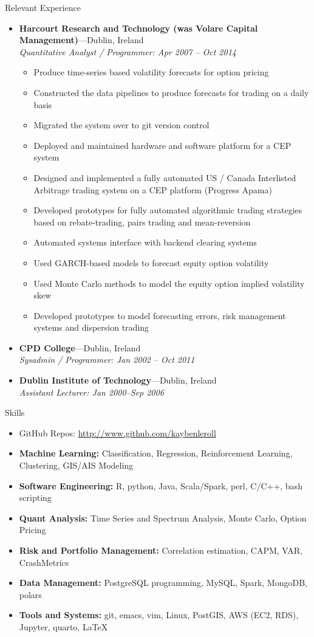 \documentclass[11pt,a4paper,oneside]{article}
\newenvironment{ressection}[1]{
  \vspace{4pt}
  {\Large#1}
  \begin{itemize}
    \vspace{3pt}
}{
  \end{itemize}
}
\newcommand{\resitem}[1]{
  \vspace{-4pt}
  \item \begin{flushleft} #1 \end{flushleft}
}
\newcommand{\ressubitem}[1]{
  \vspace{-1pt}
  \item \begin{flushleft} #1 \end{flushleft}
}
\newcommand{\resbigitem}[3]{
  \vspace{-5pt}
  \item
  \textbf{#1}---#2 \\
  \textit{#3}
}
\newenvironment{ressubsec}[3]{
  \resbigitem{#1}{#2}{#3}
  \vspace{-2pt}
  \begin{itemize}
}{
  \end{itemize}
}
\begin{document}
\begin{ressection}{Relevant Experience}
  \begin{ressubsec}{Harcourt Research and Technology (was Volare Capital Management)}{Dublin, Ireland}{Quantitative Analyst / Programmer: Apr 2007 -- Oct 2014}
    \ressubitem{Produce time-series based volatility forecasts for option pricing}
    \ressubitem{Constructed the data pipelines to produce forecasts for trading on a daily basis}
    \ressubitem{Migrated the system over to git version control}
    \ressubitem{Deployed and maintained hardware and software platform for a CEP system}
    \ressubitem{Designed and implemented a fully automated US / Canada Interlisted Arbitrage trading system on a CEP platform (Progress Apama)}
    \ressubitem{Developed prototypes for fully automated algorithmic trading strategies based on rebate-trading, pairs trading and mean-reversion}
    \ressubitem{Automated systems interface with backend clearing systems}
    \ressubitem{Used GARCH-based models to forecast equity option volatility}
    \ressubitem{Used Monte Carlo methods to model the equity option implied volatility skew}
    \ressubitem{Developed prototypes to model forecasting errors, risk management systems and dispersion trading}
  \end{ressubsec}

  \resbigitem{CPD College}{Dublin, Ireland}{Sysadmin / Programmer: Jan 2002 -- Oct 2011}

  \resbigitem{Dublin Institute of Technology}{Dublin, Ireland}{Assistant Lecturer: Jan 2000--Sep 2006}

\end{ressection}


\begin{ressection}{Skills}

  \item[] \hspace*{-\leftmargin} GitHub Repos: \href{http://www.github.com/kaybenleroll}{http://www.github.com/kaybenleroll}
  \vspace{4pt}

  \resitem{\textbf{Machine Learning:} Classification, Regression, Reinforcement Learning, Clustering, GIS/AIS Modeling}
  \resitem{\textbf{Software Engineering:} R, python, Java, Scala/Spark, perl, C/C++, bash scripting}
  \resitem{\textbf{Quant Analysis:} Time Series and Spectrum Analysis, Monte Carlo, Option Pricing}
  \resitem{\textbf{Risk and Portfolio Management:} Correlation estimation, CAPM, VAR, CrashMetrics}
  \resitem{\textbf{Data Management:} PostgreSQL programming, MySQL, Spark, MongoDB, polars}
  \resitem{\textbf{Tools and Systems:} git, emacs, vim, Linux, PostGIS, AWS (EC2, RDS), Jupyter, quarto, LaTeX}
\end{ressection}
\end{document}
